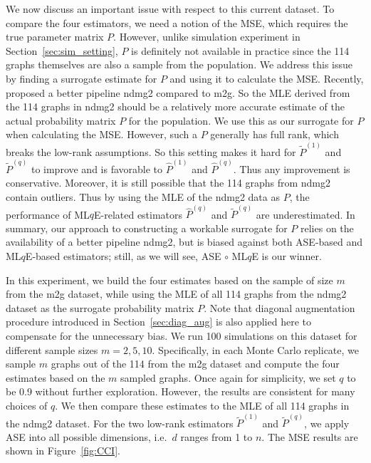 We now discuss an important issue with respect to this current dataset. To compare the four estimators, we need a notion of the MSE, which requires the true parameter matrix $P$. However, unlike simulation experiment in Section~\ref{sec:sim_setting}, $P$ is definitely not available in practice since the 114 graphs themselves are also a sample from the population. We address this issue by finding a surrogate estimate for $P$ and using it to calculate the MSE.
Recently, \citet{kiar2016ndmg} proposed a better pipeline ndmg2 compared to m2g. So the MLE derived from the 114 graphs in ndmg2 should be a relatively more accurate estimate of the actual probability matrix $P$ for the population. We use this as our surrogate for $P$ when calculating the MSE. However, such a $P$ generally has full rank, which breaks the low-rank assumptions. So this setting makes it hard for $\widetilde{P}^{(1)}$ and $\widetilde{P}^{(q)}$ to improve and is favorable to $\hat{P}^{(1)}$ and $\hat{P}^{(q)}$. Thus any improvement is conservative. Moreover, it is still possible that the 114 graphs from ndmg2 contain outliers. Thus by using the MLE of the ndmg2 data as $P$, the performance of ML$q$E-related estimators $\hat{P}^{(q)}$ and $\widetilde{P}^{(q)}$ are underestimated.
In summary, our approach to constructing a workable surrogate for $P$ relies on the availability of a better pipeline ndmg2, but is biased against both ASE-based and ML$q$E-based estimators; still, as we will see,  ASE $\circ$ ML$q$E is our winner.

In this experiment, we build the four estimates based on the sample of size $m$ from the m2g dataset, while using the MLE of all 114 graphs from the ndmg2 dataset as the surrogate probability matrix $P$. Note that diagonal augmentation procedure introduced in Section~\ref{sec:diag_aug} is also applied here to compensate for the unnecessary bias.
We run 100 simulations on this dataset for different sample sizes $m = 2, 5, 10$. Specifically, in each Monte Carlo replicate, we sample $m$ graphs out of the 114 from the m2g dataset and compute the four estimates based on the $m$ sampled graphs. Once again for simplicity, we set $q$ to be 0.9 without further exploration. However, the results are consistent for many choices of $q$. We then compare these estimates to the MLE of all 114 graphs in the ndmg2 dataset.
For the two low-rank estimators $\widetilde{P}^{(1)}$ and $\widetilde{P}^{(q)}$, we apply ASE into all possible dimensions, i.e.\ $d$ ranges from 1 to $n$. The MSE results are shown in Figure~\ref{fig:CCI}.

